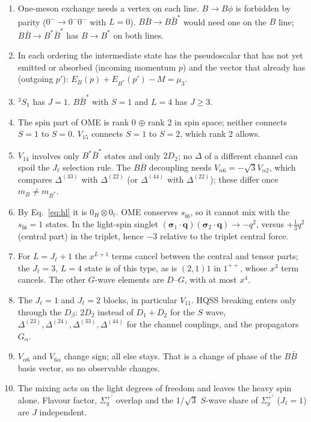 \documentclass[11pt,a4paper]{article}
\newcommand{\BB}{B\bar B}
\newcommand{\BBst}{B\bar B^*}
\newcommand{\BstBst}{B^*\bar B^*}
\newcommand{\D}[2]{\Delta^{(#1)}_{#2}}
\newcommand{\vq}{\bm q}
\begin{document}
\begin{enumerate}
\item One-meson exchange needs a vertex on each line. $B\to B\phi$ is forbidden by parity ($0^-\to0^-0^-$ with $L=0$). $\BB\to\BBst$ would need one on the $B$ line; $\BB\to\BstBst$ has $B\to B^*$ on both lines.
\item In each ordering the intermediate state has the pseudoscalar that has not yet emitted or absorbed (incoming momentum $p$) and the vector that already has (outgoing $p'$): $E_B(p)+E_{B^*}(p')-M=\mu_3$.
\item $^3S_1$ has $J=1$. $\BBst$ with $S=1$ and $L=4$ has $J\ge3$.
\item The spin part of OME is rank 0 $\oplus$ rank 2 in spin space; neither connects $S=1$ to $S=0$. $V_{15}$ connects $S=1$ to $S=2$, which rank 2 allows.
\item $V_{14}$ involves only $\BstBst$ states and only $2D_2$; no $\Delta$ of a different channel can spoil the $J_\ell$ selection rule. The $\BB$ decoupling needs $V_{\alpha6}=-\sqrt3V_{\alpha2}$, which compares $\D{33}{}$ with $\D{22}{}$ (or $\D{44}{}$ with $\D{22}{}$); these differ once $m_B\neq m_{B^*}$.
\item By Eq.~\eqref{eq:hl} it is $0_H\otimes0_\ell$. OME conserves $s_{\bar bb}$, so it cannot mix with the $s_{\bar bb}=1$ states. In the light-spin singlet $(\bm\sigma_1\cdot\vq)(\bm\sigma_2\cdot\vq)\to-q^2$, versus $+\frac13q^2$ (central part) in the triplet, hence $-3$ relative to the triplet central force.
\item For $L=J_\ell+1$ the $x^{L+1}$ terms cancel between the central and tensor parts; the $J_\ell=3$, $L=4$ state is of this type, as is $(2,1)1$ in $1^{++}$, whose $x^3$ term cancels. The other $G$-wave elements are $D$--$G$, with at most $x^4$.
\item The $J_\ell=1$ and $J_\ell=2$ blocks, in particular $V_{11}$. HQSS breaking enters only through the $D_\beta$: $2D_2$ instead of $D_1+D_2$ for the $S$ wave, $\D{23}{},\D{24}{},\D{33}{},\D{44}{}$ for the channel couplings, and the propagators $G_\alpha$.
\item $V_{\alpha6}$ and $V_{6\alpha}$ change sign; all else stays. That is a change of phase of the $\BB$ basis vector, so no observable changes.
\item The mixing acts on the light degrees of freedom and leaves the heavy spin alone. Flavour factor, $\Sigma_g^{+\prime}$ overlap and the $1/\sqrt3$ $S$-wave share of $\Sigma_g^{+\prime}$ ($J_\ell=1$) are $J$ independent.
\end{enumerate}
\end{document}
